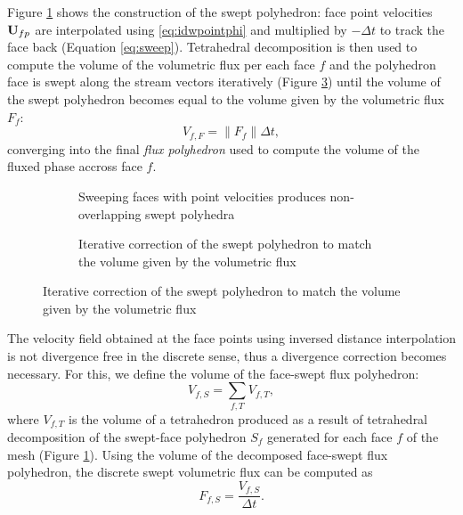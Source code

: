 Figure \ref{fig:sweptPolyhedron:sweeping} shows the construction of the swept
polyhedron: face point velocities $\mathbf U_{fp}$ are interpolated using 
\eqref{eq:idwpointphi} and multiplied by $-\Delta t$ to track the
face back (Equation \ref{eq:sweep}). Tetrahedral decomposition is then used to
compute the volume of the volumetric flux per each face $f$ and the polyhedron
face is swept along the stream vectors iteratively (Figure
\ref{fig:sweptPolyhedron:correcting}) until the volume of the swept polyhedron
becomes equal to the volume given by the volumetric flux $F_f$: 
%
\begin{equation}
    V_{f,F} = \| F_f \| \Delta t,
    \label{eq:VF}
\end{equation}
converging into the final \emph{flux polyhedron} used to compute the volume of
the fluxed phase accross face $f$.
%
\begin{figure}
   \begin{subfigure}[b]{0.45\columnwidth}
       \centering
       \def\svgwidth{\columnwidth}
       {\footnotesize
            
       }
       \caption{Sweeping faces with point velocities produces non-overlapping swept polyhedra} 
       \label{fig:sweptPolyhedron:sweeping}
   \end{subfigure}
   \begin{subfigure}[b]{0.45\columnwidth}
       \centering
       \def\svgwidth{\columnwidth}
       {\footnotesize
            
       }
       \caption{Iterative correction of the swept polyhedron to match the volume given by the volumetric flux}
       \label{fig:sweptPolyhedron:correcting}
   \end{subfigure}
\end{figure}
%
The velocity field obtained at the face points using inversed distance
interpolation is not divergence free in the discrete sense, thus a divergence 
correction becomes necessary. For this, we define the volume of the face-swept 
flux polyhedron:
%
\begin{equation}
    V_{f,S} = \sum_{f,T} V_{f,T}, 
\end{equation}
%
where $V_{f,T}$ is the volume of a tetrahedron produced as a result of
tetrahedral decomposition of the swept-face polyhedron $S_f$ generated for each
face $f$ of the mesh (Figure \ref{fig:sweptPolyhedron:sweeping}).  Using the volume
of the decomposed face-swept flux polyhedron, the discrete swept volumetric
flux can be computed as
\begin{equation}
    F_{f,S} = \frac{V_{f,S}}{\Delta t}.
\end{equation}
